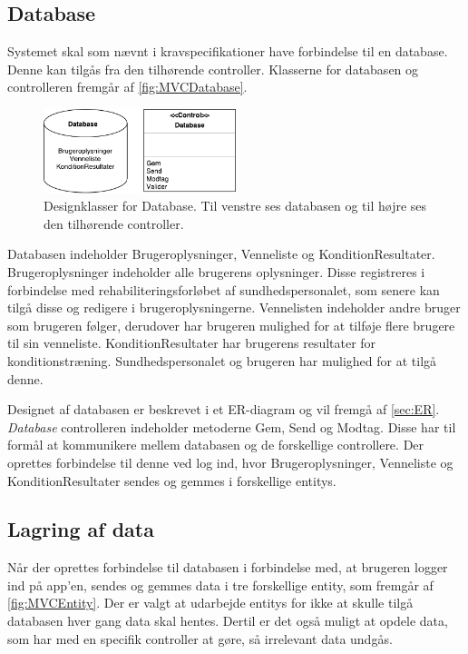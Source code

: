 \subsection*{Database}
Systemet skal som nævnt i kravspecifikationer have forbindelse til en database. Denne kan tilgås fra den tilhørende controller. Klasserne for databasen og controlleren fremgår af \autoref{fig:MVCDatabase}. 

\begin{figure} [H]
\centering
\includegraphics[width=0.5\textwidth]{figures/MVC/MVCDatabase}
\caption{Designklasser for Database. Til venstre ses databasen og til højre ses den tilhørende controller.}
\label{fig:MVCDatabase}
\end{figure}

\noindent
Databasen indeholder Brugeroplysninger, Venneliste og KonditionResultater. Brugeroplysninger indeholder alle brugerens oplysninger. Disse registreres i forbindelse med rehabiliteringsforløbet af sundhedspersonalet, som senere kan tilgå disse og redigere i brugeroplysningerne. Vennelisten indeholder andre bruger som brugeren følger, derudover har brugeren mulighed for at tilføje flere brugere til sin venneliste. KonditionResultater har brugerens resultater for konditionstræning. Sundhedspersonalet og brugeren har mulighed for at tilgå denne. 

Designet af databasen er beskrevet i et ER-diagram og vil fremgå af \autoref{sec:ER}. \textit{Database} controlleren indeholder metoderne Gem, Send og Modtag. Disse har til formål at kommunikere mellem databasen og de forskellige controllere. Der oprettes forbindelse til denne ved log ind, hvor Brugeroplysninger, Venneliste og KonditionResultater sendes og gemmes i forskellige entitys.

\subsection*{Lagring af data}  \label{sec:entity}
Når der oprettes forbindelse til databasen i forbindelse med, at brugeren logger ind på app'en, sendes og gemmes data i tre forskellige entity, som fremgår af \autoref{fig:MVCEntity}. Der er valgt at udarbejde entitys for ikke at skulle tilgå databasen hver gang data skal hentes. Dertil er det også muligt at opdele data, som har med en specifik controller at gøre, så irrelevant data undgås. 

